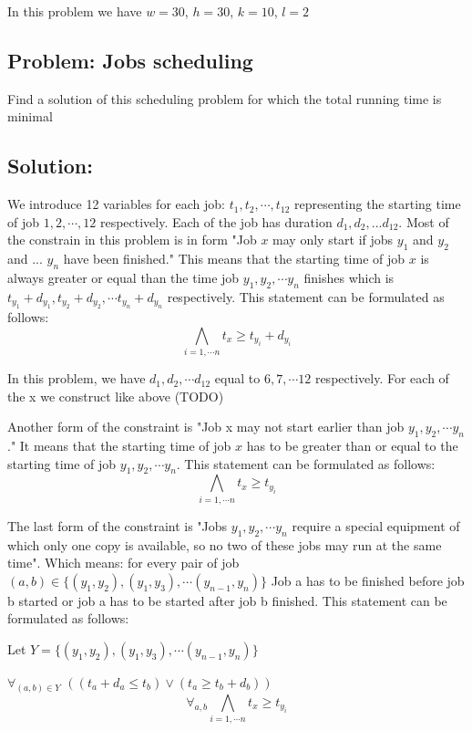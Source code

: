 \documentclass[12pt]{article}
\begin{document}
In this problem we have $w=30$, $h=30$, $k=10$, $l=2$

\subsection*{Problem: Jobs scheduling}
Find a solution of this scheduling problem for which the total running time is minimal

\subsection*{Solution:}
We introduce 12 variables for each job: $t_1, t_2, \cdots , t_{12}$ representing the starting time of job $1, 2, \cdots, 12$ respectively. Each of the job has duration $d_1, d_2, ... d_{12}$. Most of the constrain in this problem is in form "Job $x$ may only start if jobs $y_1$ and $y_2$ and ... $y_n$ have been finished." This means that the starting time of job $x$ is always greater or equal than the time job $y_1, y_2, \cdots y_n$ finishes which is $t_{y_1}+d_{y_1}, t_{y_2}+d_{y_2}, \cdots t_{y_n}+d_{y_n}$ respectively. This statement can be formulated as follows:
\[ \bigwedge_{i=1,\cdots n} t_x \geq t_{y_i}+d_{y_i} \]

In this problem, we have $d_1, d_2, \cdots d_{12}$ equal to $6, 7, \cdots 12$ respectively. For each of the x we construct like above (TODO)

Another form of the constraint is "Job x may not start earlier than job $y_1, y_2, \cdots y_n$." It means that the starting time of job $x$ has to be greater than or equal to the starting time of job $y_1, y_2, \cdots y_n$. This statement can be formulated as follows:
\[ \bigwedge_{i=1,\cdots n} t_x \geq t_{y_i} \]

The last form of the constraint is "Jobs $y_1, y_2, \cdots y_n$ require a special equipment of which only one copy is available, so no two of these jobs may run at the same time". Which means: for every pair of job $(a,b) \in \{(y_1, y_2), (y_1, y_3), \cdots (y_{n-1}, y_{n})\}$ Job a has to be finished before job b started or job a has to be started after job b finished. This statement can be formulated as follows:

Let $Y=\{(y_1, y_2), (y_1, y_3), \cdots (y_{n-1}, y_{n})\}$

   {\Large $\forall_{(a,b) \in Y}$} $((t_a + d_a \leq t_b) \vee (t_a \geq t_b+d_b) )$
   \[ \forall_{a,b}\bigwedge_{i=1,\cdots n} t_x \geq t_{y_i} \]
\end{document}
